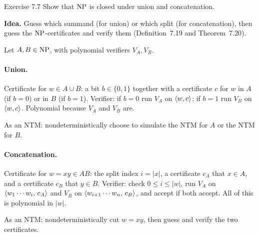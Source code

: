 \begin{question}{Exercise 7.7}
Show that $\mathrm{NP}$ is closed under union and concatenation.
\end{question}
\begin{soln}
\textbf{Idea.} Guess which summand (for union) or which split (for concatenation), then guess the $\mathrm{NP}$-certificates and verify them (Definition~7.19 and Theorem~7.20).

Let $A,B\in\mathrm{NP}$, with polynomial verifiers $V_A,V_B$.

\paragraph{Union.}
Certificate for $w\in A\cup B$: a bit $b\in\{0,1\}$ together with a certificate $c$ for $w$ in $A$ (if $b=0$) or in $B$ (if $b=1$).
Verifier: if $b=0$ run $V_A$ on $\langle w,c\rangle$; if $b=1$ run $V_B$ on $\langle w,c\rangle$. Polynomial because $V_A$ and $V_B$ are.

As an NTM: nondeterministically choose to simulate the NTM for $A$ or the NTM for $B$.

\paragraph{Concatenation.}
Certificate for $w=xy\in AB$: the split index $i=|x|$, a certificate $c_A$ that $x\in A$, and a certificate $c_B$ that $y\in B$.
Verifier: check $0\le i\le |w|$, run $V_A$ on $\langle w_1\cdots w_i,\,c_A\rangle$ and $V_B$ on $\langle w_{i+1}\cdots w_n,\,c_B\rangle$, and accept if both accept. All of this is polynomial in $|w|$.

As an NTM: nondeterministically cut $w=xy$, then guess and verify the two certificates.
\end{soln}

